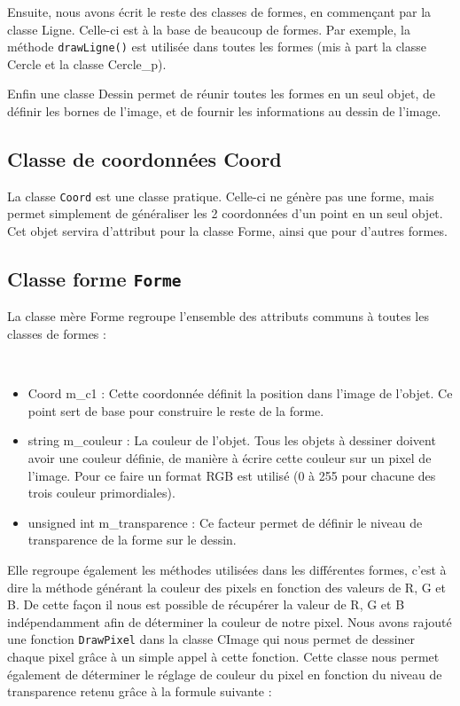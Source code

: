 \documentclass[11pt]{article}
\begin{document}
Ensuite, nous avons écrit le reste des classes de formes, en commençant par la classe Ligne. Celle-ci est à la base de beaucoup de formes. Par exemple, la méthode \texttt{drawLigne()} est utilisée dans toutes les formes (mis à part la classe Cercle et la classe Cercle\_p).

Enfin une classe Dessin permet de réunir toutes les formes en un seul objet, de définir les bornes de l'image, et de fournir les informations au dessin de l'image. 

\subsection{Classe de coordonnées Coord}

La classe \texttt{Coord} est une classe pratique. Celle-ci ne génère pas une forme, mais permet simplement de généraliser les 2 coordonnées d'un point en un seul objet. Cet objet servira d'attribut pour la classe Forme, ainsi que pour d'autres formes. 

\subsection{Classe forme \texttt{Forme}}

La classe mère Forme regroupe l'ensemble des attributs communs à toutes les classes de formes :

\\

\begin{itemize}
    \item Coord m\_c1 : Cette coordonnée définit la position dans l'image de l'objet. Ce point sert de base pour construire le reste de la forme. 
    \item string m\_couleur : La couleur de l'objet. Tous les objets à dessiner doivent avoir une couleur définie, de manière à écrire cette couleur sur un pixel de l'image. Pour ce faire un format RGB est utilisé (0 à 255 pour chacune des trois couleur primordiales). 
    \item unsigned int m\_transparence : Ce facteur permet de définir le niveau de transparence de la forme sur le dessin. 
\end{itemize}

Elle regroupe également les méthodes utilisées dans les différentes formes, c'est à dire la méthode générant la couleur des pixels en fonction des valeurs de R, G et B. De cette façon il nous est possible de récupérer la valeur de R, G et B indépendamment afin de déterminer la couleur de notre pixel. Nous avons rajouté une fonction \texttt{DrawPixel} dans la classe CImage qui nous permet de dessiner chaque pixel grâce à un simple appel à cette fonction. Cette classe nous permet également de déterminer le réglage de couleur du pixel en fonction du niveau de transparence retenu grâce à la formule suivante : 
\end{document}

